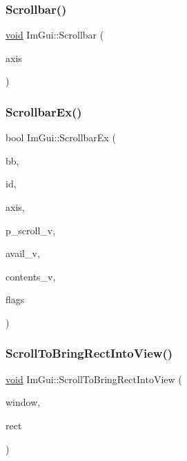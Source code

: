 \mbox{\label{namespaceImGui_a54a5006faded850f626ab20bd34aea9e}} 
\subsubsection{\texorpdfstring{Scrollbar()}{Scrollbar()}}
{\footnotesize\ttfamily \hyperlink{imgui__impl__opengl3__loader_8h_ac668e7cffd9e2e9cfee428b9b2f34fa7}{void} Im\+Gui\+::\+Scrollbar (\begin{DoxyParamCaption}\item[{\hyperlink{imgui__internal_8h_a468e54d5ed387abfbf0d1fc1e33ab483}{Im\+Gui\+Axis}}]{axis }\end{DoxyParamCaption})}

\mbox{\label{namespaceImGui_a35eab777db4f6cb0d5242fd6968dab73}} 
\subsubsection{\texorpdfstring{Scrollbar\+Ex()}{ScrollbarEx()}}
{\footnotesize\ttfamily bool Im\+Gui\+::\+Scrollbar\+Ex (\begin{DoxyParamCaption}\item[{const \hyperlink{structImRect}{Im\+Rect} \&}]{bb,  }\item[{Im\+Gui\+ID}]{id,  }\item[{\hyperlink{imgui__internal_8h_a468e54d5ed387abfbf0d1fc1e33ab483}{Im\+Gui\+Axis}}]{axis,  }\item[{Im\+S64 $\ast$}]{p\+\_\+scroll\+\_\+v,  }\item[{Im\+S64}]{avail\+\_\+v,  }\item[{Im\+S64}]{contents\+\_\+v,  }\item[{Im\+Draw\+Flags}]{flags }\end{DoxyParamCaption})}

\mbox{\label{namespaceImGui_aebce8a3f6952e9c4520bab4201752ddc}} 
\subsubsection{\texorpdfstring{Scroll\+To\+Bring\+Rect\+Into\+View()}{ScrollToBringRectIntoView()}}
{\footnotesize\ttfamily \hyperlink{imgui__impl__opengl3__loader_8h_ac668e7cffd9e2e9cfee428b9b2f34fa7}{void} Im\+Gui\+::\+Scroll\+To\+Bring\+Rect\+Into\+View (\begin{DoxyParamCaption}\item[{\hyperlink{structImGuiWindow}{Im\+Gui\+Window} $\ast$}]{window,  }\item[{const \hyperlink{structImRect}{Im\+Rect} \&}]{rect }\end{DoxyParamCaption})\hspace{0.3cm}{\ttfamily [inline]}}

